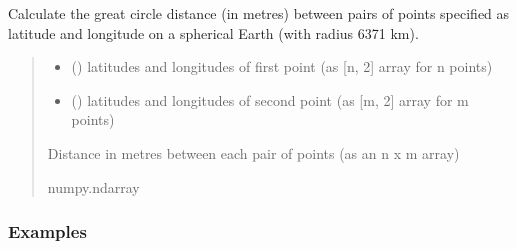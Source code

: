 \documentclass[letterpaper,10pt,english]{sphinxmanual}
\begin{document}

\begin{fulllineitems}
\label{\detokenize{index:locator.great_circle_distance}}
\pysigstartsignatures
{}
\pysigstopsignatures
\sphinxAtStartPar
Calculate the great circle distance (in metres) between pairs of
points specified as latitude and longitude on a spherical Earth
(with radius 6371 km).
\begin{quote}\begin{description}
\begin{itemize}
\item {} 
\sphinxAtStartPar
{} () \textendash{} latitudes and longitudes of first point (as {[}n, 2{]} array for n points)

\item {} 
\sphinxAtStartPar
{} () \textendash{} latitudes and longitudes of second point (as {[}m, 2{]} array for m points)

\end{itemize}

\sphinxAtStartPar
Distance in metres between each pair of points (as an n x m array)

\sphinxAtStartPar
numpy.ndarray

\end{description}\end{quote}
\subsubsection*{Examples}


\end{fulllineitems}
\end{document}
